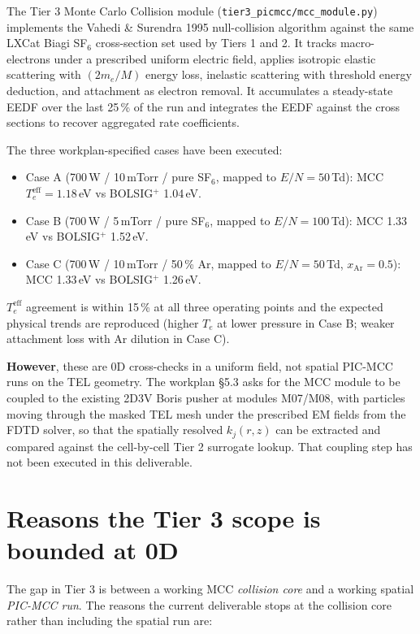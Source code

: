 \documentclass[11pt,a4paper]{article}
\newcommand{\sfsix}{SF$_6$}
\begin{document}
The Tier 3 Monte Carlo Collision module
(\texttt{tier3\_picmcc/mcc\_module.py}) implements the Vahedi \&
Surendra 1995 null-collision algorithm against the same LXCat Biagi
\sfsix{} cross-section set used by Tiers 1 and 2. It tracks
macro-electrons under a prescribed uniform electric field, applies
isotropic elastic scattering with $(2m_e/M)$ energy loss, inelastic
scattering with threshold energy deduction, and attachment as
electron removal. It accumulates a steady-state EEDF over the last
25\,\% of the run and integrates the EEDF against the cross sections
to recover aggregated rate coefficients.

The three workplan-specified cases have been executed:
\begin{itemize}
  \item Case A (700\,W / 10\,mTorr / pure \sfsix{}, mapped to
        $E/N = 50$\,Td): MCC $T_e^{\mathrm{eff}} = 1.18$\,eV vs
        BOLSIG$^+$ 1.04\,eV.
  \item Case B (700\,W / 5\,mTorr / pure \sfsix{}, mapped to
        $E/N = 100$\,Td): MCC 1.33\,eV vs BOLSIG$^+$ 1.52\,eV.
  \item Case C (700\,W / 10\,mTorr / 50\,\% Ar, mapped to
        $E/N = 50$\,Td, $x_{\mathrm{Ar}} = 0.5$): MCC 1.33\,eV vs
        BOLSIG$^+$ 1.26\,eV.
\end{itemize}
$T_e^{\mathrm{eff}}$ agreement is within 15\,\% at all three
operating points and the expected physical trends are reproduced
(higher $T_e$ at lower pressure in Case B; weaker attachment loss
with Ar dilution in Case C).

\textbf{However}, these are 0D cross-checks in a uniform field, not
spatial PIC-MCC runs on the TEL geometry. The workplan §5.3 asks for
the MCC module to be coupled to the existing 2D3V Boris pusher at
modules M07/M08, with particles moving through the masked TEL mesh
under the prescribed EM fields from the FDTD solver, so that the
spatially resolved $k_j(r, z)$ can be extracted and compared against
the cell-by-cell Tier 2 surrogate lookup. That coupling step has not
been executed in this deliverable.

\section{Reasons the Tier 3 scope is bounded at 0D}
\label{sec:why}

The gap in Tier 3 is between a working MCC \emph{collision core} and
a working spatial \emph{PIC-MCC run}. The reasons the current
deliverable stops at the collision core rather than including the
spatial run are:
\end{document}
